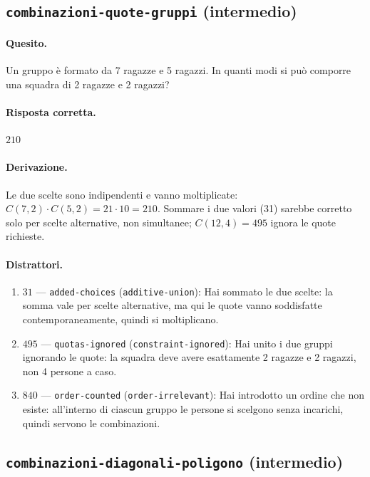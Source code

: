 \subsection{\texorpdfstring{\texttt{combinazioni-quote-gruppi} (intermedio)}{combinazioni-quote-gruppi (intermedio)}}

\paragraph{Quesito.} Un gruppo è formato da 7 ragazze e 5 ragazzi. In quanti modi si può comporre una squadra di 2 ragazze e 2 ragazzi?

\paragraph{Risposta corretta.} $210$

\paragraph{Derivazione.} Le due scelte sono indipendenti e vanno moltiplicate: $C(7,2) \cdot  C(5,2) = 21 \cdot  10 = 210$. Sommare i due valori (31) sarebbe corretto solo per scelte alternative, non simultanee; $C(12,4) = 495$ ignora le quote richieste.

\paragraph{Distrattori.}
\begin{enumerate}
  \item $31$ --- \texttt{added-choices} (\texttt{additive-union}): Hai sommato le due scelte: la somma vale per scelte alternative, ma qui le quote vanno soddisfatte contemporaneamente, quindi si moltiplicano.
  \item $495$ --- \texttt{quotas-ignored} (\texttt{constraint-ignored}): Hai unito i due gruppi ignorando le quote: la squadra deve avere esattamente 2 ragazze e 2 ragazzi, non 4 persone a caso.
  \item $840$ --- \texttt{order-counted} (\texttt{order-irrelevant}): Hai introdotto un ordine che non esiste: all'interno di ciascun gruppo le persone si scelgono senza incarichi, quindi servono le combinazioni.
\end{enumerate}

\subsection{\texorpdfstring{\texttt{combinazioni-diagonali-poligono} (intermedio)}{combinazioni-diagonali-poligono (intermedio)}}


